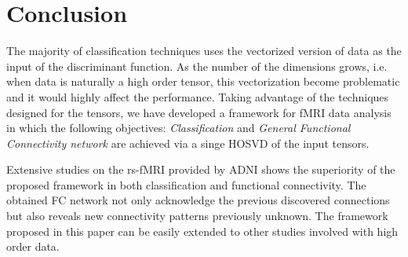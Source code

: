 \documentclass[journal]{IEEEtran}
\begin{document}
	
	
	
	
	
	
	
	
	
	
	
	
	
	
	
	
	
	
	\section{Conclusion}
	The majority of classification techniques uses the vectorized version of data as the input of the discriminant function. As the number of the dimensions grows, i.e. when data is naturally a high order tensor, this vectorization become problematic and it would highly affect the  performance. Taking advantage of the techniques designed for the tensors, we have developed a framework for fMRI data analysis in which the following objectives: 
\textit{Classification} 
		and
		\textit{General Functional Connectivity network}
	are achieved via a singe HOSVD of the input tensors. 
	
	Extensive studies on the rs-fMRI provided by ADNI shows the superiority of the proposed framework in both classification and functional connectivity. The obtained FC network not only acknowledge the previous discovered connections but also reveals new connectivity patterns previously unknown.
	The framework proposed in this paper can be easily extended to other studies involved with high order data.  
	
\end{document}
